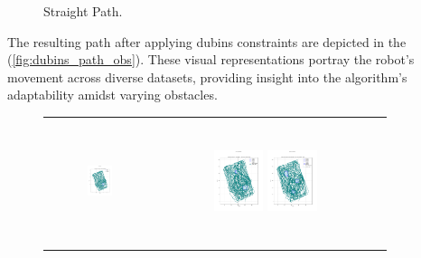 \begin{figure}[]
\begin{tabular}{ccc}
    \end{tabular}
    \caption{Straight Path.\label{fig:straight_path_obs}}
\end{figure}


\vspace*{6mm}

The resulting path after applying dubins constraints are depicted in the (\autoref{fig:dubins_path_obs}). These visual representations portray the robot's movement across diverse datasets, providing insight into the algorithm's adaptability amidst varying obstacles. 



\begin{figure}[htbp]
    \centering
    \begin{tabular}{ccc} 
         \includegraphics[height=36mm,width=0.24\textwidth]{Images/simulation_obs/obs_dubins/1.png}
        & \includegraphics[height=36mm,width=0.24\textwidth]{Images/simulation_obs/obs_dubins/2.png}
         \includegraphics[height=36mm,width=0.24\textwidth]{Images/simulation_obs/obs_dubins/3.png}\\[-4pt]


\end{tabular}
\end{figure}
